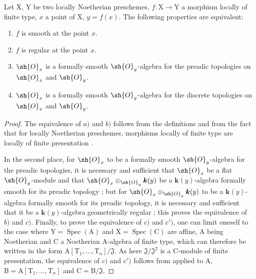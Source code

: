 \begin{theorem}[6.8.6]
\label{IV.6.8.6}
Let $\mathrm{X}$, $\mathrm{Y}$ be two locally Noetherian preschemes, $f:\mathrm{X}\to\mathrm{Y}$ a morphism locally of finite type, $x$ a point of $\mathrm{X}$, $y=f(x)$. The following properties are equivalent:
\begin{enumerate}[label=\emph{\alph*)}]
  \item $f$ is smooth at the point $x$.
  \item $f$ is regular at the point $x$.
  \item $\sh{O}_x$ is a formally smooth $\sh{O}_y$-algebra  for the preadic topologies on $\sh{O}_x$ and $\sh{O}_y$.
  \item[\emph{c$'$)}] $\sh{O}_x$ is a formally smooth $\sh{O}_y$-algebra  for the discrete topologies on $\sh{O}_x$ and $\sh{O}_y$.
\end{enumerate}
\end{theorem}

\begin{proof}
The equivalence of $a)$ and $b)$ follows from the definitions  and from the fact that for locally Noetherian preschemes, morphisms locally of finite type are locally of finite presentation .

In the second place, for $\sh{O}_x$ to be a formally smooth $\sh{O}_y$-algebra for the preadic topologies, it is necessary and sufficient that $\sh{O}_x$ be a flat $\sh{O}_y$-module and that $\sh{O}_x\otimes_{\sh{O}_y}\boldsymbol{k}(y)$ be a $\boldsymbol{k}(y)$-algebra formally smooth for its preadic topology ; but for $\sh{O}_x\otimes_{\sh{O}_y}\boldsymbol{k}(y)$ to be a $\boldsymbol{k}(y)$-algebra formally smooth for its preadic topology, it is necessary and sufficient that it be a $\boldsymbol{k}(y)$-algebra geometrically regular ; this proves the equivalence of $b)$ and $c)$. Finally, to prove the equivalence of $c)$ and $c')$, one can limit oneself to the case where $\mathrm{Y}=\operatorname{Spec}(\mathrm{A})$ and $\mathrm{X}=\operatorname{Spec}(\mathrm{C})$ are affine, $\mathrm{A}$ being Noetherian and $\mathrm{C}$ a Noetherian $\mathrm{A}$-algebra of finite type, which can therefore be written in the form $\mathrm{A}[\mathrm{T}_1,\ldots,\mathrm{T}_n]/\mathfrak{J}$. As here $\mathfrak{J}/\mathfrak{J}^2$ is a $\mathrm{C}$-module of finite presentation, the equivalence of $c)$ and $c')$ follows from  applied to $\mathrm{A}$, $\mathrm{B}=\mathrm{A}[\mathrm{T}_1,\ldots,\mathrm{T}_n]$ and $\mathrm{C}=\mathrm{B}/\mathfrak{J}$.
\end{proof}


